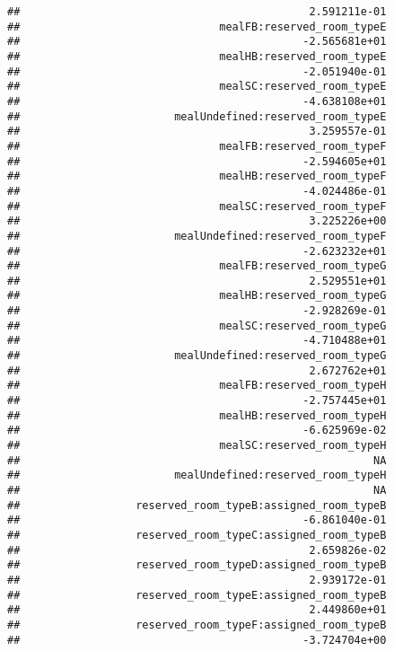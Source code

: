\documentclass[
]{article}
\begin{document}
\begin{verbatim}
##                                             2.591211e-01 
##                               mealFB:reserved_room_typeE 
##                                            -2.565681e+01 
##                               mealHB:reserved_room_typeE 
##                                            -2.051940e-01 
##                               mealSC:reserved_room_typeE 
##                                            -4.638108e+01 
##                        mealUndefined:reserved_room_typeE 
##                                             3.259557e-01 
##                               mealFB:reserved_room_typeF 
##                                            -2.594605e+01 
##                               mealHB:reserved_room_typeF 
##                                            -4.024486e-01 
##                               mealSC:reserved_room_typeF 
##                                             3.225226e+00 
##                        mealUndefined:reserved_room_typeF 
##                                            -2.623232e+01 
##                               mealFB:reserved_room_typeG 
##                                             2.529551e+01 
##                               mealHB:reserved_room_typeG 
##                                            -2.928269e-01 
##                               mealSC:reserved_room_typeG 
##                                            -4.710488e+01 
##                        mealUndefined:reserved_room_typeG 
##                                             2.672762e+01 
##                               mealFB:reserved_room_typeH 
##                                            -2.757445e+01 
##                               mealHB:reserved_room_typeH 
##                                            -6.625969e-02 
##                               mealSC:reserved_room_typeH 
##                                                       NA 
##                        mealUndefined:reserved_room_typeH 
##                                                       NA 
##                  reserved_room_typeB:assigned_room_typeB 
##                                            -6.861040e-01 
##                  reserved_room_typeC:assigned_room_typeB 
##                                             2.659826e-02 
##                  reserved_room_typeD:assigned_room_typeB 
##                                             2.939172e-01 
##                  reserved_room_typeE:assigned_room_typeB 
##                                             2.449860e+01 
##                  reserved_room_typeF:assigned_room_typeB 
##                                            -3.724704e+00 

\end{verbatim}
\end{document}
